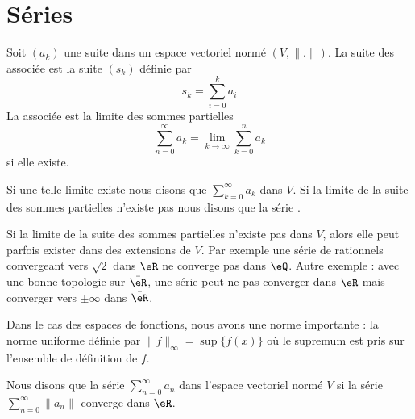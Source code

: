

\section{Séries}
\label{SECooYCQBooSZNXhd}

\begin{definition}\label{DefGFHAaOL}
    Soit \( (a_k)\) une suite dans un espace vectoriel normé \( (V,\| . \| )\). La suite des  associée est la suite \( (s_k)\) définie par 
    \begin{equation}
        s_k=\sum_{i=0}^ka_i
    \end{equation}
    La  associée est la limite des sommes partielles
    \begin{equation}
        \sum_{n=0}^{\infty}a_k=\lim_{k\to \infty} \sum_{k=0}^na_k
    \end{equation}
    si elle existe.

    Si une telle limite existe nous disons que \( \sum_{k=0}^{\infty}a_k\)  dans \( V\). Si la limite de la suite des sommes partielles n'existe pas nous disons que la série .
\end{definition}

\begin{remark}
    Si la limite de la suite des sommes partielles n'existe pas dans \( V\), alors elle peut parfois exister dans des extensions de \( V\). Par exemple une série de rationnels convergeant vers \( \sqrt{2}\) dans \( \eR\) ne converge pas dans \( \eQ\). Autre exemple : avec une bonne topologie sur \( \bar \eR\), une série peut ne pas converger dans \( \eR\) mais converger vers \( \pm\infty\) dans \( \bar \eR\).
\end{remark}

Dans le cas des espaces de fonctions, nous avons une norme importante : la norme uniforme définie par \( \| f \|_{\infty}=\sup\{ f(x) \}\) où le supremum est pris sur l'ensemble de définition de \( f\).
\begin{definition} \label{DefVFUIXwU}
    Nous disons que la série \( \sum_{n=0}^{\infty}a_n\) dans l'espace vectoriel normé \( V\)  si la série \( \sum_{n=0}^{\infty}\| a_n \|\) converge dans \( \eR\).
\end{definition}

